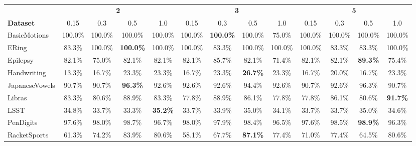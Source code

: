 \begin{tabular}{lcccccccccccc}
\toprule
{}                        & \multicolumn{4}{c}{\textbf{2}}    & \multicolumn{4}{c}{\textbf{3}}    & \multicolumn{4}{c}{\textbf{5}}  \\
\cmidrule(lr){2-5} \cmidrule(lr){6-9} \cmidrule(lr){10-13}
\textbf{Dataset}          & 0.15   & 0.3    & 0.5    & 1.0    & 0.15   & 0.3    & 0.5    & 1.0    & 0.15   & 0.3    & 0.5    & 1.0 \\
\midrule
BasicMotions              &                100.0\% &     100.0\% &     100.0\% &     100.0\% &      100.0\% &     \textbf{100.0\%} &     100.0\% &      75.0\% &      100.0\% &     100.0\% &     100.0\% &     100.0\% \\
ERing                     &                 83.3\% &     100.0\% &     \textbf{100.0\%} &     100.0\% &      100.0\% &      83.3\% &     100.0\% &     100.0\% &      100.0\% &      83.3\% &      83.3\% &     100.0\% \\
Epilepsy                  &                 82.1\% &      75.0\% &      82.1\% &      82.1\% &       82.1\% &      85.7\% &      82.1\% &      71.4\% &       82.1\% &      82.1\% &      \textbf{89.3\%} &      75.4\% \\
Handwriting               &                 13.3\% &      16.7\% &      23.3\% &      23.3\% &       16.7\% &      23.3\% &      \textbf{26.7\%} &      23.3\% &       16.7\% &      20.0\% &      16.7\% &      23.3\% \\
JapaneseVowels            &                 90.7\% &      90.7\% &      \textbf{96.3\%} &      92.6\% &       92.6\% &      92.6\% &      94.4\% &      92.6\% &       90.7\% &      92.6\% &      96.3\% &      90.7\% \\
Libras                    &                 83.3\% &      80.6\% &      88.9\% &      83.3\% &       77.8\% &      88.9\% &      86.1\% &      77.8\% &       77.8\% &      86.1\% &      80.6\% &      \textbf{91.7\%} \\
LSST                      &                 34.8\% &      33.7\% &      33.3\% &      \textbf{35.2\%} &       33.7\% &      33.9\% &      35.0\% &      34.1\% &       33.7\% &      33.7\% &      35.0\% &      34.6\% \\
PenDigits                 &                 97.6\% &      98.0\% &      98.7\% &      96.7\% &       98.0\% &      97.9\% &      98.4\% &      96.5\% &       97.6\% &      98.5\% &      \textbf{98.9\%} &      96.3\% \\
RacketSports              &                 61.3\% &      74.2\% &      83.9\% &      80.6\% &       58.1\% &      67.7\% &      \textbf{87.1\%} &      77.4\% &       71.0\% &      77.4\% &      64.5\% &      80.6\% \\
\bottomrule
\end{tabular}
